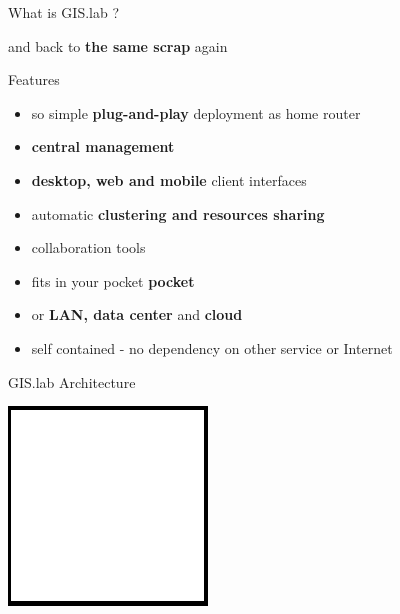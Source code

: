 \documentclass[12pt]{beamer}
\begin{document}
\begin{frame}{What is GIS.lab ?}
	\begin{center}
		and back to \textbf{the same scrap} again
	\end{center}
\end{frame}

\begin{frame}{Features}
	\begin{itemize}[<+->]
		\item so simple \textbf{plug-and-play} deployment as home router
		\item \textbf{central management}
		\item \textbf{desktop, web and mobile} client interfaces
		\item automatic \textbf{clustering and resources sharing}
		\item collaboration tools
		\item fits in your pocket \textbf{pocket}
		\item or \textbf{LAN, data center} and \textbf{cloud}
		\item self contained - no dependency on other service or Internet
	\end{itemize}
\end{frame}

\begin{frame}{GIS.lab Architecture}
	\begin{center}
		\includegraphics[keepaspectratio=true,height=0.5\textheight]{images/image.png}
	\end{center}
\end{frame}
\end{document}
